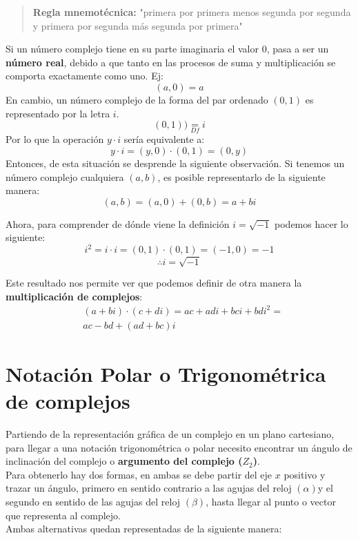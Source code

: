 \documentclass[12pt, twocolumn]{article}
\begin{document}
\begin{quote}
    \textbf{Regla mnemotécnica:} "primera por primera menos segunda por segunda y primera por segunda más segunda por primera"
\end{quote}

Si un número complejo tiene en su parte imaginaria el valor $0$, pasa a ser un \textbf{número real}, debido a que tanto en las procesos de suma y multiplicación se comporta exactamente como uno. Ej: $$(a,0)=a$$
En cambio, un número complejo de la forma del par ordenado $(0,1)$ es representado por la letra $i$.
$$\boxed{(0,1))\underset{Df}{=}i}$$
Por lo que la operación $y\cdot i$ sería equivalente a:
$$y\cdot i = (y,0)\cdot (0,1)=(0,y)$$
Entonces, de esta situación se desprende la siguiente observación. Si tenemos un número complejo cualquiera $(a,b)$, es posible representarlo de la siguiente manera:
$$(a,b)=(a,0)+(0,b)=\boxed{a+bi}$$

Ahora, para comprender de dónde viene la definición $i=\sqrt{-1}$ podemos hacer lo siguiente:
$$i^{2}=i\cdot i = (0,1)\cdot (0,1) = (-1,0) = -1 $$
$$\boxed{\therefore i = \sqrt{-1}}$$

Este resultado nos permite ver que podemos definir de otra manera la \textbf{multiplicación de complejos}:
\begin{equation*}
    \begin{aligned}
        & (a+bi)\cdot (c+di) = ac+adi + bci + bdi^{2}= \\
        & \boxed{ac-bd+(ad+bc)i}
    \end{aligned}
\end{equation*}  


\section{Notación Polar o Trigonométrica de complejos}
Partiendo de la representación gráfica de un complejo en un plano cartesiano, para llegar a una notación trigonométrica o polar necesito encontrar un ángulo de inclinación del complejo o \textbf{argumento del complejo ($Z_{2}$)}. \\ 
Para obtenerlo hay dos formas, en ambas se debe partir del eje $x$ positivo y trazar un ángulo, primero en sentido contrario a las agujas del reloj  $(\alpha)$y el segundo en sentido de las agujas del reloj $(\beta)$, hasta llegar al punto o vector que representa al complejo. \\
Ambas alternativas quedan representadas de la siguiente manera:
\begin{center}
\end{center}
\end{document}
